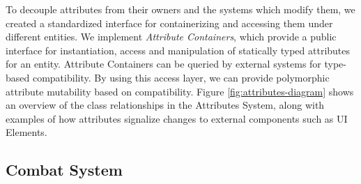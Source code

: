 To decouple attributes from their owners and the systems which modify them, we created a standardized interface for containerizing and accessing them under different entities. We implement \emph{Attribute Containers}, which provide a public interface for instantiation, access and manipulation of statically typed attributes for an entity. Attribute Containers can be queried by external systems for type-based compatibility. By using this access layer, we can provide polymorphic attribute mutability based on compatibility. Figure \ref{fig:attributes-diagram} shows an overview of the class relationships in the Attributes System, along with examples of how attributes signalize changes to external components such as UI Elements.




\subsection{Combat System}

